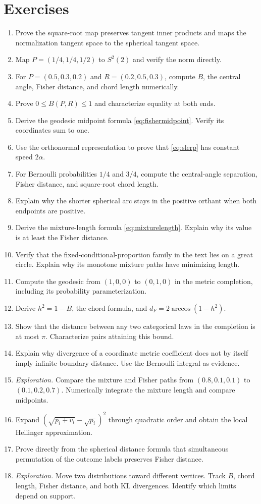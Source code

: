 \documentclass[11pt,oneside,openany]{book}
\theoremstyle{definition}
\theoremstyle{remark}
\newenvironment{exercises}{\begin{enumerate}[label=\thechapter.\arabic*,ref=\thechapter.\arabic*,leftmargin=2.8em,itemsep=6pt]}{\end{enumerate}}
\numberwithin{equation}{chapter}
\begin{document}
\section{Exercises}
\begin{exercises}
\item Prove the square-root map preserves tangent inner products and maps the normalization tangent space to the spherical tangent space.
\item Map $P=(1/4,1/4,1/2)$ to $S^2(2)$ and verify the norm directly.
\item For $P=(0.5,0.3,0.2)$ and $R=(0.2,0.5,0.3)$, compute $B$, the central angle, Fisher distance, and chord length numerically.
\item Prove $0\leq B(P,R)\leq1$ and characterize equality at both ends.
\item Derive the geodesic midpoint formula \eqref{eq:fishermidpoint}. Verify its coordinates sum to one.
\item Use the orthonormal representation to prove that \eqref{eq:slerp} has constant speed $2\alpha$.
\item For Bernoulli probabilities $1/4$ and $3/4$, compute the central-angle separation, Fisher distance, and square-root chord length.
\item Explain why the shorter spherical arc stays in the positive orthant when both endpoints are positive.
\item Derive the mixture-length formula \eqref{eq:mixturelength}. Explain why its value is at least the Fisher distance.
\item Verify that the fixed-conditional-proportion family in the text lies on a great circle. Explain why its monotone mixture paths have minimizing length.
\item Compute the geodesic from $(1,0,0)$ to $(0,1,0)$ in the metric completion, including its probability parameterization.
\item Derive $h^2=1-B$, the chord formula, and $d_F=2\arccos(1-h^2)$.
\item Show that the distance between any two categorical laws in the completion is at most $\pi$. Characterize pairs attaining this bound.
\item Explain why divergence of a coordinate metric coefficient does not by itself imply infinite boundary distance. Use the Bernoulli integral as evidence.
\item \emph{Exploration.} Compare the mixture and Fisher paths from $(0.8,0.1,0.1)$ to $(0.1,0.2,0.7)$. Numerically integrate the mixture length and compare midpoints.
\item Expand $(\sqrt{p_i+v_i}-\sqrt{p_i})^2$ through quadratic order and obtain the local Hellinger approximation.
\item Prove directly from the spherical distance formula that simultaneous permutation of the outcome labels preserves Fisher distance.
\item \emph{Exploration.} Move two distributions toward different vertices. Track $B$, chord length, Fisher distance, and both KL divergences. Identify which limits depend on support.
\end{exercises}
\end{document}
